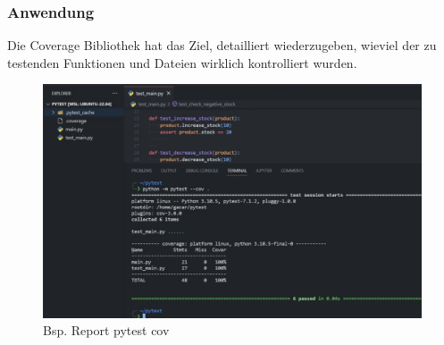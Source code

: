 \subsubsection{Anwendung}
	Die Coverage Bibliothek hat das Ziel, detailliert wiederzugeben, wieviel der zu testenden Funktionen und Dateien wirklich kontrolliert wurden. 

\begin{figure}[H]
	\centering
	\includegraphics[scale = 0.6]{attachment/chapter_2/Scc092}
	\caption{Bsp. Report pytest cov}
\end{figure}

